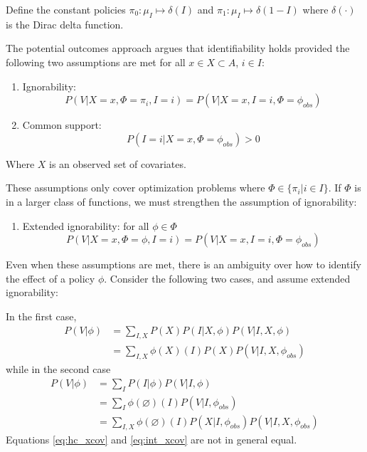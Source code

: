 Define the constant policies $\pi_0:\mu_I\mapsto \delta(I)$ and $\pi_1:\mu_I\mapsto \delta(1-I)$ where $\delta(\cdot)$ is the Dirac delta function.

The potential outcomes approach argues that identifiability holds provided the following two assumptions are met for all $x\in X\subset A$, $i\in I$: \cite{rubin_causal_2005} \cite{sontag_causal_nodate}
\begin{enumerate}
    \item Ignorability: \[P(V|X=x,\Phi=\pi_i, I=i) = P(V|X=x,I=i,\Phi=\phi_{obs})\]
    \item Common support: \[P(I=i|X=x,\Phi=\phi_{obs})>0\]
\end{enumerate}
Where $X$ is an observed set of covariates.

These assumptions only cover optimization problems where $\Phi\in \{\pi_i|i\in I\}$. If $\Phi$ is in a larger class of functions, we must strengthen the assumption of ignorability:

\begin{enumerate}
    \item Extended ignorability: for all $\phi\in\Phi$ \[P(V|X=x,\Phi=\phi, I=i) = P(V|X=x,I=i,\Phi=\phi_{obs})\]
\end{enumerate}

Even when these assumptions are met, there is an ambiguity over how to identify the effect of a policy $\phi$. Consider the following two cases, and assume extended ignorability:

\begin{center}
\end{center}


In the first case,
\begin{align}
    P(V|\phi)&=\sum_{I,X} P(X) P(I|X,\phi) P(V|I,X,\phi)\\
             &=\sum_{I,X} \phi(X)(I) P(X)  P(V|I,X,\phi_{obs}) \label{eq:hc_xcov}
\end{align}
while in the second case
\begin{align}
    P(V|\phi)&=\sum_I P(I|\phi) P(V|I,\phi) \\
             &=\sum_I \phi(\varnothing)(I) P(V|I,\phi_{obs})\\
             &=\sum_{I,X} \phi(\varnothing)(I) P(X|I,\phi_{obs}) P(V|I,X,\phi_{obs}) \label{eq:int_xcov}
\end{align}
Equations \ref{eq:hc_xcov} and \ref{eq:int_xcov} are not in general equal.

